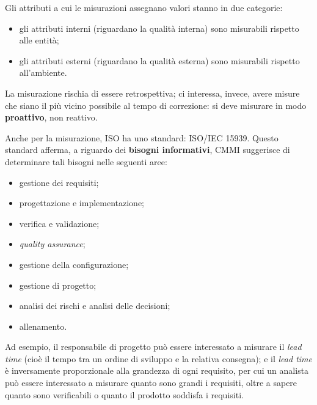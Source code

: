 \documentclass[a4paper]{article}
\begin{document}
		
Gli attributi a cui le misurazioni assegnano valori stanno in due categorie:
		
	\begin{itemize}
		
			
	\item gli attributi interni (riguardano la qualità interna) sono misurabili rispetto alle entità;
			
	\item gli attributi esterni (riguardano la qualità esterna) sono misurabili rispetto all'ambiente.
		
	\end{itemize}

		
La misurazione rischia di essere retrospettiva; ci interessa, invece, avere misure che siano il più vicino possibile al tempo di correzione: si deve misurare in modo \textbf{proattivo}, non reattivo.
		
Anche per la misurazione, ISO ha uno standard: ISO/IEC 15939. Questo standard afferma, a riguardo dei \textbf{bisogni informativi},  CMMI suggerisce di determinare tali bisogni nelle seguenti aree:
		
	\begin{itemize}
		
			
	\item gestione dei requisiti;
			
	\item progettazione e implementazione;
			
	\item verifica e validazione;
			
	\item \emph{quality assurance};
			
	\item gestione della configurazione;
			
	\item gestione di progetto;
			
	\item analisi dei rischi e analisi delle decisioni;
			
	\item allenamento.
		
	\end{itemize}

		
Ad esempio, il responsabile di progetto può essere interessato a misurare il \emph{lead time} (cioè il tempo tra un ordine di sviluppo e la relativa consegna); e il \emph{lead time} è inversamente proporzionale alla grandezza di ogni requisito, per cui un analista può essere interessato a misurare quanto sono grandi i requisiti, oltre a sapere quanto sono verificabili o quanto il prodotto soddisfa i requisiti.
		
\end{document}
